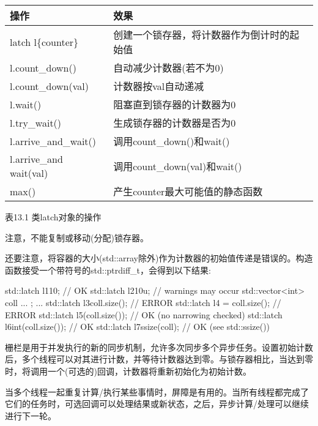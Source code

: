 \begin{longtable}[c]{|l|l|}
\hline
\textbf{操作}      & \textbf{效果}                              \\ \hline
\endfirsthead
%
\endhead
%
latch l\{counter\} & 创建一个锁存器，将计数器作为倒计时的起始值 \\ \hline
l.count\_down()    & 自动减少计数器(若不为0)                     \\ \hline
l.count\_down(val)      & 计数器按val自动递减     \\ \hline
l.wait()                & 阻塞直到锁存器的计数器为0   \\ \hline
l.try\_wait()           & 生成锁存器的计数器是否为0 \\ \hline
l.arrive\_and\_wait()   & 调用count\_down()和wait()               \\ \hline
l.arrive\_and wait(val) & 调用count\_down(val)和wait()            \\ \hline
max()              & 产生counter最大可能值的静态函数   \\ \hline
\end{longtable}

\begin{center}
表13.1 类latch对象的操作
\end{center}

注意，不能复制或移动(分配)锁存器。

还要注意，将容器的大小(std::array除外)作为计数器的初始值传递是错误的。构造函数接受一个带符号的std::ptrdiff\_t，会得到以下结果:

\begin{cpp}
std::latch l1{10}; // OK
std::latch l2{10u}; // warnings may occur
std::vector<int> coll{ ... };
...
std::latch l3{coll.size()}; // ERROR
std::latch l4 = coll.size(); // ERROR
std::latch l5(coll.size()); // OK (no narrowing checked)
std::latch l6{int(coll.size())}; // OK
std::latch l7{ssize(coll)}; // OK (see std::ssize())
\end{cpp}


栅栏是用于并发执行的新的同步机制，允许多次同步多个异步任务。设置初始计数后，多个线程可以对其进行计数，并等待计数器达到零。与锁存器相比，当达到零时，将调用一个(可选的)回调，计数器将重新初始化为初始计数。

当多个线程一起重复计算/执行某些事情时，屏障是有用的。当所有线程都完成了它们的任务时，可选回调可以处理结果或新状态，之后，异步计算/处理可以继续进行下一轮。


